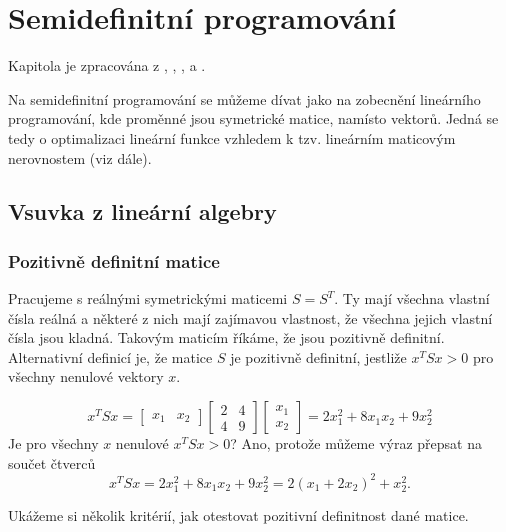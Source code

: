 \chapter{Semidefinitní programování}

Kapitola je zpracována z \cite{linear-algebra-and-learning-from-data}, \cite{aspects-of-semidefinite-programming}, \cite{semidefinite-optimization-and-convex-algebraic-geometry}, \cite{approximation-algorithms} a \cite{ko}.

Na semidefinitní programování se můžeme dívat jako na zobecnění lineárního programování, kde proměnné jsou symetrické matice, namísto vektorů. Jedná se tedy o optimalizaci lineární funkce vzhledem k tzv. lineárním maticovým nerovnostem (viz dále).

\section{Vsuvka z lineární algebry}

\subsection*{Pozitivně definitní matice}

Pracujeme s reálnými symetrickými maticemi $S = S^T$. Ty mají všechna vlastní čísla reálná a některé z nich mají zajímavou vlastnost, že všechna jejich vlastní čísla jsou kladná. Takovým maticím říkáme, že jsou pozitivně definitní. Alternativní definicí je, že matice $S$ je pozitivně definitní, jestliže $x^TSx > 0$ pro všechny nenulové vektory $x$.

\begin{pr}
$$
    x^T S x = 
    \begin{bmatrix}
        x_1 & x_2
    \end{bmatrix}
    \begin{bmatrix}
        2 & 4 \\
        4 & 9
    \end{bmatrix}
    \begin{bmatrix}
        x_1 \\
        x_2
    \end{bmatrix} =
    2 x_1^2 + 8 x_1 x_2 + 9 x_2^2
$$
Je pro všechny $x$ nenulové $x^TSx > 0$? Ano, protože můžeme výraz přepsat na součet čtverců
$$
    x^TSx = 2 x_1^2 + 8 x_1 x_2 + 9 x_2^2 = 2 (x_1 + 2 x_2)^2 + x_2^2.
$$
\end{pr}

Ukážeme si několik kritérií, jak otestovat pozitivní definitnost dané matice.


